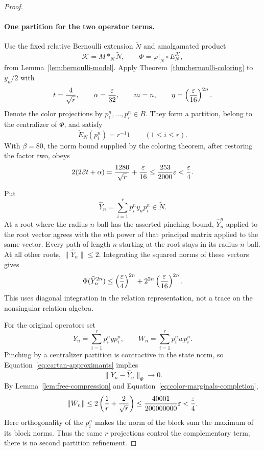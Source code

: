 \begin{proof}
\paragraph{One partition for the two operator terms.}
Use the fixed relative Bernoulli extension $\widetilde N$ and amalgamated product
\[
 \mathcal K=M*_N\widetilde N,
 \qquad \Phi=\varphi|_N\circ E_N^{\mathcal K},
\]
from Lemma~\ref{lem:bernoulli-model}. Apply Theorem~\ref{thm:bernoulli-coloring} to $y_n/2$ with
\begin{equation}\label{eq:coloring-parameters}
 t=\frac4{\sqrt r},\qquad \alpha=\frac{\varepsilon}{32},
 \qquad m=n,\qquad \eta=\left(\frac{\varepsilon}{16}\right)^{2n}.
\end{equation}
Denote the color projections by $p_1^n,\ldots,p_r^n\in B$. They form a partition, belong to the centralizer of $\Phi$, and satisfy
\begin{equation}\label{eq:color-marginals-completion}
 \widetilde E_N(p_i^n)=r^{-1}1\qquad(1\le i\le r).
\end{equation}
With $\beta=80$, the norm bound supplied by the coloring theorem, after restoring the factor two, obeys
\begin{equation}\label{eq:cartan-numerical-bound}
 2(2\beta t+\alpha)=\frac{1280}{\sqrt r}+\frac{\varepsilon}{16}
 \le\frac{253}{2000}\varepsilon<\frac{\varepsilon}4.
\end{equation}

Put
\[
 \widehat Y_n=\sum_{i=1}^r p_i^n y_n p_i^n\in\widetilde N.
\]
At a root where the radius-$n$ ball has the asserted pinching bound, $\widehat Y_n^n$ applied to the root vector agrees with the $n$th power of that principal matrix applied to the same vector. Every path of length $n$ starting at the root stays in its radius-$n$ ball. At all other roots, $\|\widehat Y_n\|\le2$. Integrating the squared norms of these vectors gives
\begin{equation}\label{eq:cartan-high-moment}
 \Phi(\widehat Y_n^{2n})
 \le\left(\frac{\varepsilon}4\right)^{2n}
       +2^{2n}\left(\frac{\varepsilon}{16}\right)^{2n}.
\end{equation}
This uses diagonal integration in the relation representation, not a trace on the nonsingular relation algebra.

For the original operators set
\[
 Y_n=\sum_{i=1}^r p_i^n y p_i^n,
 \qquad W_n=\sum_{i=1}^r p_i^n w p_i^n.
\]
Pinching by a centralizer partition is contractive in the state norm, so Equation~\eqref{eq:cartan-approximants} implies
\begin{equation}\label{eq:pinched-approximation}
 \|Y_n-\widehat Y_n\|_\Phi\longrightarrow0.
\end{equation}
By Lemma~\ref{lem:free-compression} and Equation~\eqref{eq:color-marginals-completion},
\begin{equation}\label{eq:free-numerical-bound}
 \|W_n\|\le2\left(\frac1r+\frac2{\sqrt r}\right)
 \le\frac{40001}{200000000}\varepsilon<\frac{\varepsilon}4.
\end{equation}
Here orthogonality of the $p_i^n$ makes the norm of the block sum the maximum of its block norms. Thus the same $r$ projections control the complementary term; there is no second partition refinement.


\end{proof}

